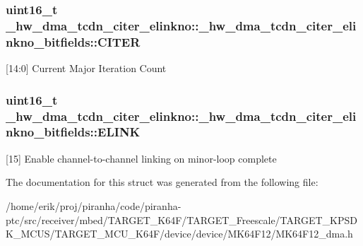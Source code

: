 \subsubsection[{\texorpdfstring{C\+I\+T\+ER}{CITER}}]{\setlength{\rightskip}{0pt plus 5cm}uint16\+\_\+t \+\_\+hw\+\_\+dma\+\_\+tcdn\+\_\+citer\+\_\+elinkno\+::\+\_\+hw\+\_\+dma\+\_\+tcdn\+\_\+citer\+\_\+elinkno\+\_\+bitfields\+::\+C\+I\+T\+ER}\hypertarget{struct__hw__dma__tcdn__citer__elinkno_1_1__hw__dma__tcdn__citer__elinkno__bitfields_ad9e6661faaf50cabbb173984e0415fb2}{}\label{struct__hw__dma__tcdn__citer__elinkno_1_1__hw__dma__tcdn__citer__elinkno__bitfields_ad9e6661faaf50cabbb173984e0415fb2}
\mbox{[}14\+:0\mbox{]} Current Major Iteration Count 
\subsubsection[{\texorpdfstring{E\+L\+I\+NK}{ELINK}}]{\setlength{\rightskip}{0pt plus 5cm}uint16\+\_\+t \+\_\+hw\+\_\+dma\+\_\+tcdn\+\_\+citer\+\_\+elinkno\+::\+\_\+hw\+\_\+dma\+\_\+tcdn\+\_\+citer\+\_\+elinkno\+\_\+bitfields\+::\+E\+L\+I\+NK}\hypertarget{struct__hw__dma__tcdn__citer__elinkno_1_1__hw__dma__tcdn__citer__elinkno__bitfields_aac44892f8d84b0122b1a424f4bfb3381}{}\label{struct__hw__dma__tcdn__citer__elinkno_1_1__hw__dma__tcdn__citer__elinkno__bitfields_aac44892f8d84b0122b1a424f4bfb3381}
\mbox{[}15\mbox{]} Enable channel-\/to-\/channel linking on minor-\/loop complete 

The documentation for this struct was generated from the following file\+:\begin{DoxyCompactItemize}
\item 
/home/erik/proj/piranha/code/piranha-\/ptc/src/receiver/mbed/\+T\+A\+R\+G\+E\+T\+\_\+\+K64\+F/\+T\+A\+R\+G\+E\+T\+\_\+\+Freescale/\+T\+A\+R\+G\+E\+T\+\_\+\+K\+P\+S\+D\+K\+\_\+\+M\+C\+U\+S/\+T\+A\+R\+G\+E\+T\+\_\+\+M\+C\+U\+\_\+\+K64\+F/device/device/\+M\+K64\+F12/M\+K64\+F12\+\_\+dma.\+h\end{DoxyCompactItemize}
